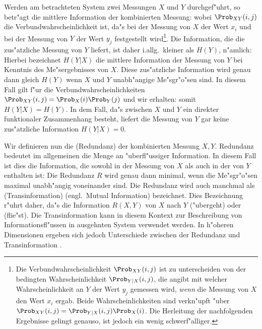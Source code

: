 Werden am betrachteten System zwei Messungen $X$ und $Y$ durchgef"uhrt, so betr"agt die
mittlere Information der kombinierten Messung:
wobei $\Prob_{XY}(i,j)$ die Verbundwahrscheinlichkeit ist, da"s bei der
Messung von $X$ der Wert $x_i$ und bei der Messung von $Y$ der Wert $y_j$ festgestellt
wird\footnote{Die Verbundwahrscheinlichkeit $\Prob_{XY}(i,j)$ ist zu unterscheiden von der
  bedingten Wahrscheinlichkeit $\Prob_{Y|X}(i,j)$, die angibt mit welcher
  Wahrscheinlichkeit an $Y$ der Wert $y_j$ gemessen wird, \emph{wenn} die Messung von $X$
  den Wert $x_i$ ergab. Beide Wahrscheinlichkeiten sind verkn"upft "uber
  $\Prob_{XY}(i,j)=\Prob_{Y|X}(i,j)\Prob_X(i)$. Die Herleitung der nachfolgenden
  Ergebnisse gelingt genauso, ist jedoch ein wenig schwerf"alliger.}.  Die Information,
die die zus"atzliche Messung von $Y$ liefert, ist daher i.allg.\  kleiner als $H(Y)$,
n"amlich:
Hierbei bezeichnet $H(Y|X)$ die mittlere Information der
Messung von $Y$ bei Kenntnis des Me"sergebnisses von $X$. Diese zus"atzliche Information
wird genau dann gleich $H(Y)$ wenn $X$ und $Y$ unabh"angige Me"sgr"o"sen sind. In diesem
Fall gilt f"ur die Verbundwahrscheinlichkeiten $\Prob_{XY}(i,j)=\Prob_X(i)\Prob_Y(j)$ und
wir erhalten:
 somit $H(Y|X)=H(Y)$. In dem Fall, da"s zwischen $X$ und $Y$ ein direkter
funktionaler Zusammenhang besteht, liefert die Messung von $Y$ gar keine zus"atzliche
Information $H(Y|X)=0$.

Wir definieren nun die \begriff(Redundanz) der kombinierten Messung $X,Y$. Redundanz
bedeutet im allgemeinen die Menge an "uberfl"ussiger Information. In diesem Fall ist dies die
Information, die sowohl in der Messung von $X$ als auch in der von $Y$ enthalten ist:
 Die Redundanz $R$ wird genau dann minimal,
wenn die Me"sgr"o"sen maximal unabh"angig voneinander sind. Die Redundanz wird auch
manchmal als \begriff(Transinformation) (engl.\  Mutual Information) bezeichnet. Dies
Bezeichnung r"uhrt daher, da"s die Information $R(X,Y)$ von $X$ nach $Y$ \slang("ubergeht)
oder \slang(flie"st). Die Transinformation kann in diesem Kontext zur Beschreibung von
Informationsfl"ussen in ausgehnten System verwendet werden\cite{Pawelzik91}.  In h"oheren
Dimensionen ergeben sich jedoch Unterschiede zwischen der Redundanz und Transinformation
\cite{Prichard95}.



